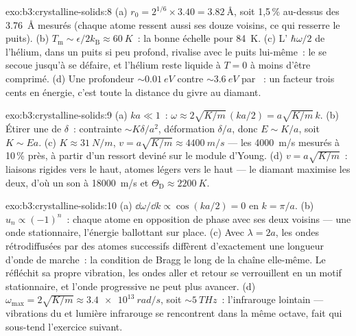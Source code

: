 \begin{solution}{exo:b3:crystalline-solids:8}
(a) $r_0 = 2^{1/6}\times3.40 = \qty{3.82}{\angstrom}$, soit 1,5\,\%
au-dessus des \qty{3.76}{\angstrom} mesurés (chaque atome ressent
aussi ses douze voisins, ce qui resserre le puits). (b)
$T_{\text{m}} \sim \epsilon/2k_{\text{B}} \approx \qty{60}{K}$~:
la bonne échelle pour \qty{84}{K}. (c) L'
$\hbar\omega/2$ de l'hélium, dans un puits si peu profond, rivalise
avec le puits lui-même~: le  se secoue jusqu'à se défaire, et
l'hélium reste liquide à $T = 0$ à moins d'être comprimé. (d) Une
profondeur $\sim\qty{0.01}{eV}$ contre $\sim\qty{3.6}{eV}$ par
~: un facteur trois cents en énergie, c'est toute
la distance du givre au diamant.
\end{solution}

\begin{solution}{exo:b3:crystalline-solids:9}
(a) $ka \ll 1$~: $\omega \approx 2\sqrt{K/m}\,(ka/2) =
a\sqrt{K/m}\,k$. (b) Étirer une  de $\delta$~: contrainte $\sim
K\delta/a^2$, déformation $\delta/a$, donc $E \sim K/a$, soit $K \sim
Ea$. (c) $K \approx \qty{31}{N/m}$, $v = a\sqrt{K/m} \approx
\qty{4400}{m/s}$ --- les \qty{4000}{m/s} mesurés à 10\,\% près, à
partir d'un ressort deviné sur le module d'Young. (d) $v = a\sqrt{K/m}$~:
liaisons rigides vers le haut, atomes légers vers le haut --- le
diamant maximise les deux, d'où un son à \qty{18000}{m/s} et
$\Theta_{\text{D}} \approx
\qty{2200}{K}$.
\end{solution}

\begin{solution}{exo:b3:crystalline-solids:10}
(a) $\dd\omega/\dd k \propto \cos(ka/2) = 0$ en $k = \pi/a$. (b)
$u_n \propto (-1)^n$~: chaque atome en opposition de phase avec ses
deux voisins --- une onde stationnaire, l'énergie ballottant sur
place. (c) Avec $\lambda = 2a$, les ondes rétrodiffusées par des
atomes successifs diffèrent d'exactement une longueur d'onde de
marche~: la condition de Bragg le long de la chaîne elle-même. Le
 réfléchit sa propre vibration, les ondes aller et retour se
verrouillent en un motif stationnaire, et l'onde progressive ne peut
plus avancer. (d) $\omega_{\text{max}} = 2\sqrt{K/m} \approx
\qty{3.4e13}{rad/s}$, soit $\sim\qty{5}{THz}$~: l'infrarouge
lointain --- vibrations du  et lumière infrarouge se
rencontrent dans la même octave, fait qui sous-tend l'exercice
suivant.
\end{solution}

